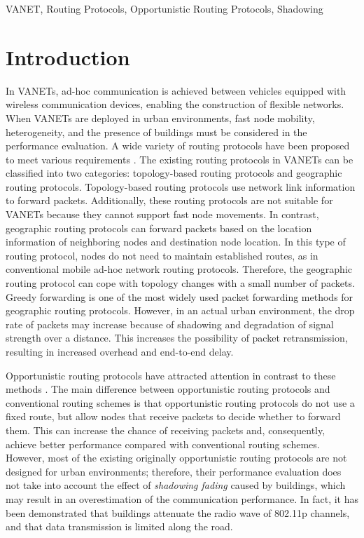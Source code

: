 \documentclass[conference]{IEEEtran}
\begin{document}
\begin{IEEEkeywords}
VANET, Routing Protocols, Opportunistic Routing Protocols, Shadowing
\end{IEEEkeywords}

\section{Introduction}
In VANETs,  ad-hoc communication is achieved between vehicles equipped with wireless communication devices, enabling the construction of flexible networks. 
When VANETs are deployed in  urban environments, fast node mobility, heterogeneity, and the presence of buildings must be considered in the performance evaluation. A wide variety of routing protocols have been proposed to meet various requirements \cite{2}.
The existing routing protocols in VANETs can be classified into two categories: topology-based routing protocols and geographic routing protocols. Topology-based routing protocols \cite{3,4,5} use network link information to forward packets. 
Additionally, these routing protocols are not suitable for VANETs because they cannot support fast node movements. In contrast, geographic routing protocols \cite{6, 7, 8 ,9} can forward packets based on the location information of neighboring nodes and destination node location. 
In this type of routing protocol, nodes do not need to maintain established routes, as in conventional mobile ad-hoc network routing protocols. 
Therefore, the geographic routing protocol can cope with topology changes with a small number of packets.
Greedy forwarding is one of the most widely used packet forwarding methods for geographic routing protocols.
However, in an actual urban environment, the drop rate of packets may increase because of shadowing and degradation of signal strength over a distance. This increases the possibility of packet retransmission, resulting in increased overhead and end-to-end delay. 


Opportunistic routing protocols have attracted attention in contrast to these methods \cite{16}. 
The main difference between opportunistic routing protocols and conventional routing schemes is that opportunistic routing protocols do not use a fixed route, but allow nodes that receive packets to decide whether to forward them. 
This can increase the chance of receiving packets and, consequently, achieve better performance compared with conventional routing schemes.
However, most of the existing originally opportunistic routing protocols  are not designed for urban environments; therefore, their performance evaluation does not take into account the effect of \textit{shadowing fading} caused by buildings, which may result in an overestimation of the communication performance. 
In fact, it has been demonstrated that buildings attenuate the radio wave of 802.11p channels, and that data transmission is limited along the road\cite{17}. 
\end{document}
